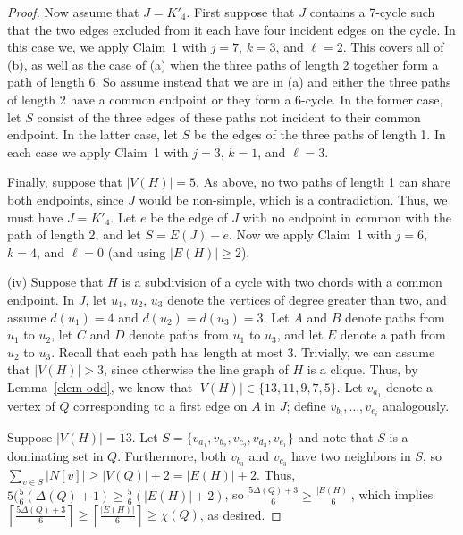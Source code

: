 \documentclass[12pt]{amsart}
\theoremstyle{plain}
\theoremstyle{definition}
\theoremstyle{remark}
\newcommand{\ceil}[1]{\left\lceil#1\right\rceil}
\begin{document}
\begin{proof}
Now assume that $J=K'_4$.  
First suppose that $J$ contains a 7-cycle such
that the two edges excluded from it each have four incident edges on the cycle.
In this case we, we apply Claim~1 with $j=7$, $k=3$, and $\ell=2$.  This covers
all of (b), as well as the case of (a) when the three paths of length 2 together
form a path of length 6.  So assume instead that we are in (a) and either the
three paths of length 2 have a common endpoint or they form a 6-cycle.
In the former case, let $S$ consist of the three edges of these paths not
incident to their common endpoint.
In the latter case, let $S$ be the edges of the three paths of length 1.
In each case we apply Claim~1 with $j=3$, $k=1$, and $\ell=3$.

Finally, suppose that $|V(H)|=5$.  As above, no two paths of length 1 can share
both endpoints, since $J$ would be non-simple, which is a contradiction.  
Thus, we must have $J=K'_4$.  Let $e$ be the edge of $J$ with no endpoint in
common with the path of length 2, and let $S=E(J)-e$.  Now we apply Claim~1 with
$j=6$, $k=4$, and $\ell=0$ (and using $|E(H)|\ge 2$).

(iv) Suppose that $H$ is a subdivision of a cycle with two chords with a common
endpoint.
In $J$, let $u_1$, $u_2$, $u_3$ denote the vertices of degree greater than two,
and assume $d(u_1)=4$ and $d(u_2)=d(u_3)=3$.  Let $A$ and $B$ denote paths from
$u_1$ to $u_2$, let $C$ and $D$ denote paths from $u_1$ to $u_3$, and let $E$
denote a path from $u_2$ to $u_3$.  Recall that each path has length at most 3.
Trivially, we can assume that $|V(H)|>3$, since otherwise the line graph of $H$
is a clique.  Thus, by Lemma~\ref{elem-odd}, we know that
$|V(H)|\in\{13,11,9,7,5\}$.
Let $v_{a_1}$ denote a vertex of $Q$ corresponding to a first edge on $A$ in
$J$; define $v_{b_i},\ldots,v_{e_i}$ analogously.  

Suppose $|V(H)|=13$.
Let $S=\{v_{a_1},v_{b_2},v_{c_2},v_{d_3},v_{e_1}\}$ and note that $S$ 
is a dominating set in $Q$.  Furthermore, 
both $v_{b_3}$ and $v_{c_3}$ have two neighbors in $S$, so $\sum_{v\in
S}|N[v]|\ge |V(Q)|+2=|E(H)|+2$.  
Thus,
$5(\frac56(\Delta(Q)+1)\ge\frac56(|E(H)|+2)$, so $\frac{5\Delta(Q)+3}6 \ge
\frac{|E(H)|}6$, which implies $\ceil{\frac{5\Delta(Q)+3}6}\ge
\ceil{\frac{|E(H)|}6}\ge\chi(Q)$, as desired.


\end{proof}
\end{document}

